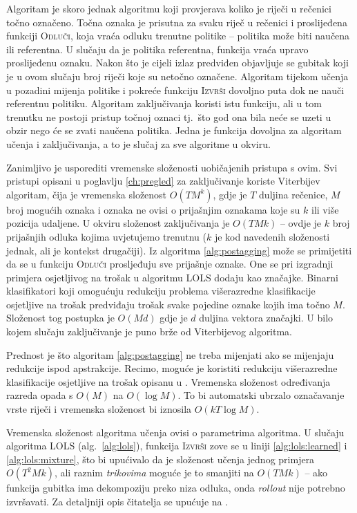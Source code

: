 Algoritam je skoro jednak algoritmu koji provjerava koliko je riječi u rečenici
točno označeno. Točna oznaka je prisutna za svaku riječ u rečenici i proslijeđena
funkciji \textsc{Odluči}, koja vraća odluku trenutne politike -- politika može biti
naučena ili referentna. U slučaju da je politika referentna, funkcija vraća upravo
proslijeđenu oznaku. Nakon što je cijeli izlaz predviđen objavljuje se gubitak
koji je u ovom slučaju broj riječi koje su netočno označene. Algoritam tijekom
učenja u pozadini mijenja politike i pokreće funkciju \textsc{Izvrši} dovoljno puta
dok ne nauči referentnu politiku. Algoritam zaključivanja koristi istu funkciju,
ali u tom trenutku ne postoji pristup točnoj oznaci tj.~što god ona bila neće se
uzeti u obzir nego će se zvati naučena politika. Jedna je funkcija dovoljna za
algoritam učenja i zaključivanja, a to je slučaj za sve algoritme u \lts{}
okviru.

Zanimljivo je usporediti vremenske složenosti uobičajenih pristupa s ovim. Svi
pristupi opisani u poglavlju \ref{ch:pregled} za zaključivanje koriste
Viterbijev algoritam, čija je vremenska složenost $O(T M ^ k)$, gdje je $T$
duljina rečenice, $M$ broj mogućih oznaka i oznaka ne ovisi o prijašnjim
oznakama koje su $k$ ili više pozicija udaljene. U \lts{} okviru složenost
zaključivanja je $O(T M k)$ -- ovdje je $k$ broj prijašnjih odluka kojima
uvjetujemo trenutnu ($k$ je kod navedenih složenosti jednak, ali je kontekst
drugačiji). Iz algoritma \ref{alg:postagging} može se primijetiti da se u
funkciju \textsc{Odluči} prosljeđuju sve prijašnje oznake. One se pri izgradnji
primjera osjetljivog na trošak u algoritmu \textsc{LOLS} dodaju kao značajke.
Binarni klasifikatori koji omogućuju redukciju problema višerazredne
klasifikacije osjetljive na trošak predviđaju trošak svake pojedine oznake kojih
ima točno $M$. Složenost tog postupka je $O(M d)$ gdje je $d$ duljina vektora
značajki. U bilo kojem slučaju zaključivanje je puno brže od Viterbijevog
algoritma.

Prednost je što algoritam \ref{alg:postagging} ne treba mijenjati ako se
mijenjaju redukcije ispod apstrakcije. Recimo, moguće je koristiti redukciju
višerazredne klasifikacije osjetljive na trošak opisanu u
\citep{beygelzimer2009error, daume2016one}. Vremenska složenost određivanja
razreda opada s $O(M)$ na $O(\log M)$. To bi automatski ubrzalo označavanje
vrste riječi i vremenska složenost bi iznosila $O(k T \log M)$.

Vremenska složenost algoritma učenja ovisi o parametrima algoritma. U slučaju
algoritma \textsc{LOLS} (alg.~\ref{alg:lols}), funkcija \textsc{Izvrši} zove se u
liniji \ref{alg:lols:learned} i \ref{alg:lols:mixture}, što bi upućivalo da je
složenost učenja jednog primjera $O(T ^ 2 M k)$, ali raznim \textit{trikovima}
moguće je to smanjiti na $O(T M k)$ -- ako funkcija gubitka ima dekompoziju
preko niza odluka, onda \textit{rollout} nije potrebno izvršavati. Za detaljniji
opis čitatelja se upućuje na \citep{daume14lts}.

